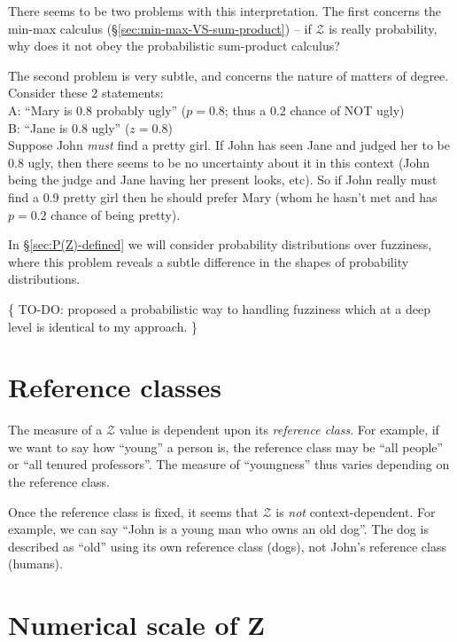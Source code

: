 There seems to be two problems with this interpretation.  The first concerns the min-max calculus (\S\ref{sec:min-max-VS-sum-product}) -- if $\mathcal{Z}$ is really probability, why does it not obey the probabilistic sum-product calculus?

The second problem is very subtle, and concerns the nature of matters of degree.  Consider these 2 statements:\\
\hspace*{1cm} A: ``Mary is 0.8 probably ugly''  ($p = 0.8$; thus a 0.2 chance of NOT ugly)\\
\hspace*{1cm} B: ``Jane is 0.8 ugly''  ($z = 0.8$)\\
Suppose John \emph{must} find a pretty girl.  If John has seen Jane and judged her to be 0.8 ugly, then there seems to be no uncertainty about it in this context (John being the judge and Jane having her present looks, etc).  So if John really must find a 0.9 pretty girl then he should prefer Mary (whom he hasn't met and has $p=0.2$ chance of being pretty).

In \S\ref{sec:P(Z)-defined} we will consider probability distributions over fuzziness, where this problem reveals a subtle difference in the shapes of probability distributions.

\{ TO-DO:  \citep*{Brachman2004} proposed a probabilistic way to handling fuzziness which at a deep level is identical to my approach.  \}

\section{Reference classes}

The measure of a $\mathcal{Z}$ value is dependent upon its \textit{reference class}.  For example, if we want to say how ``young'' a person is, the reference class may be ``all people'' or ``all tenured professors''.  The measure of ``youngness'' thus varies depending on the reference class.

Once the reference class is fixed, it seems that $\mathcal{Z}$ is \textit{not} context-dependent.  For example, we can say ``John is a young man who owns an old dog''.  The dog is described as ``old'' using its own reference class (dogs), not John's reference class (humans).

\section{Numerical scale of Z}
\label{sec:Z-numerical-scale}


